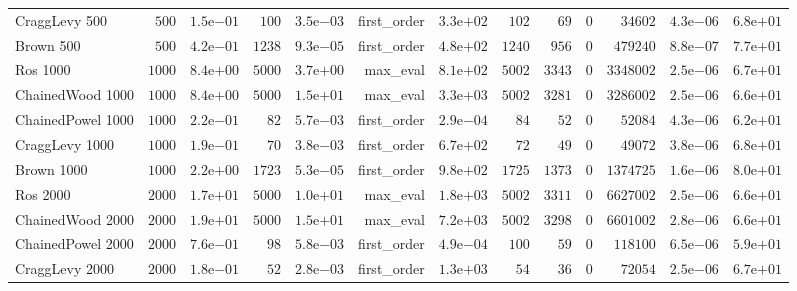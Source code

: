 \begin{longtable}[c]{lrrrrrrrrrrrr}
CraggLevy 500 & \(  500\) & \( 1.5\)e\(-01\) & \(  100\) & \( 3.5\)e\(-03\) & first\_order & \( 3.3\)e\(+02\) & \(  102\) & \(   69\) & \(    0\) & \(34602\) & \( 4.3\)e\(-06\) & \( 6.8\)e\(+01\) \\
Brown 500 & \(  500\) & \( 4.2\)e\(-01\) & \( 1238\) & \( 9.3\)e\(-05\) & first\_order & \( 4.8\)e\(+02\) & \( 1240\) & \(  956\) & \(    0\) & \(479240\) & \( 8.8\)e\(-07\) & \( 7.7\)e\(+01\) \\
Ros 1000 & \( 1000\) & \( 8.4\)e\(+00\) & \( 5000\) & \( 3.7\)e\(+00\) & max\_eval & \( 8.1\)e\(+02\) & \( 5002\) & \( 3343\) & \(    0\) & \(3348002\) & \( 2.5\)e\(-06\) & \( 6.7\)e\(+01\) \\
ChainedWood 1000 & \( 1000\) & \( 8.4\)e\(+00\) & \( 5000\) & \( 1.5\)e\(+01\) & max\_eval & \( 3.3\)e\(+03\) & \( 5002\) & \( 3281\) & \(    0\) & \(3286002\) & \( 2.5\)e\(-06\) & \( 6.6\)e\(+01\) \\
ChainedPowel 1000 & \( 1000\) & \( 2.2\)e\(-01\) & \(   82\) & \( 5.7\)e\(-03\) & first\_order & \( 2.9\)e\(-04\) & \(   84\) & \(   52\) & \(    0\) & \(52084\) & \( 4.3\)e\(-06\) & \( 6.2\)e\(+01\) \\
CraggLevy 1000 & \( 1000\) & \( 1.9\)e\(-01\) & \(   70\) & \( 3.8\)e\(-03\) & first\_order & \( 6.7\)e\(+02\) & \(   72\) & \(   49\) & \(    0\) & \(49072\) & \( 3.8\)e\(-06\) & \( 6.8\)e\(+01\) \\
Brown 1000 & \( 1000\) & \( 2.2\)e\(+00\) & \( 1723\) & \( 5.3\)e\(-05\) & first\_order & \( 9.8\)e\(+02\) & \( 1725\) & \( 1373\) & \(    0\) & \(1374725\) & \( 1.6\)e\(-06\) & \( 8.0\)e\(+01\) \\
Ros 2000 & \( 2000\) & \( 1.7\)e\(+01\) & \( 5000\) & \( 1.0\)e\(+01\) & max\_eval & \( 1.8\)e\(+03\) & \( 5002\) & \( 3311\) & \(    0\) & \(6627002\) & \( 2.5\)e\(-06\) & \( 6.6\)e\(+01\) \\
ChainedWood 2000 & \( 2000\) & \( 1.9\)e\(+01\) & \( 5000\) & \( 1.5\)e\(+01\) & max\_eval & \( 7.2\)e\(+03\) & \( 5002\) & \( 3298\) & \(    0\) & \(6601002\) & \( 2.8\)e\(-06\) & \( 6.6\)e\(+01\) \\
ChainedPowel 2000 & \( 2000\) & \( 7.6\)e\(-01\) & \(   98\) & \( 5.8\)e\(-03\) & first\_order & \( 4.9\)e\(-04\) & \(  100\) & \(   59\) & \(    0\) & \(118100\) & \( 6.5\)e\(-06\) & \( 5.9\)e\(+01\) \\
CraggLevy 2000 & \( 2000\) & \( 1.8\)e\(-01\) & \(   52\) & \( 2.8\)e\(-03\) & first\_order & \( 1.3\)e\(+03\) & \(   54\) & \(   36\) & \(    0\) & \(72054\) & \( 2.5\)e\(-06\) & \( 6.7\)e\(+01\) \\

\end{longtable}
